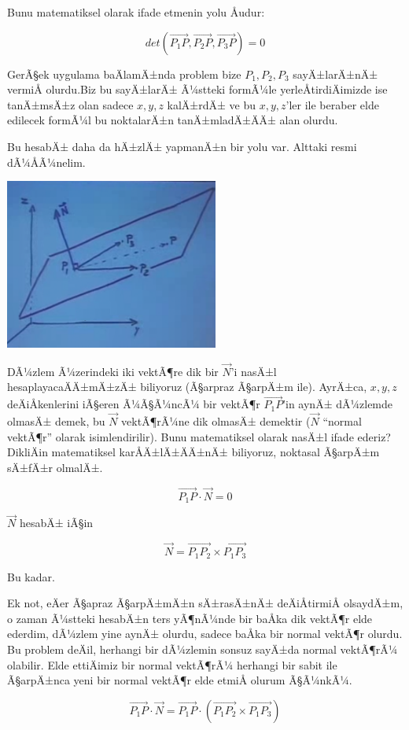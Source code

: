 \documentclass[12pt,fleqn]{article}\usepackage{../../common}
\begin{document}
Bunu matematiksel olarak ifade etmenin yolu Åudur:

$$ det(\vec{P_1P},\vec{P_2P},\vec{P_3P}) = 0 $$

GerÃ§ek uygulama baÄlamÄ±nda problem bize $P_1,P_2,P_3$ 
sayÄ±larÄ±nÄ± vermiÅ
olurdu.Biz bu sayÄ±larÄ± Ã¼stteki formÃ¼le yerleÅtirdiÄimizde ise 
tanÄ±msÄ±z olan
sadece $x,y,z$ kalÄ±rdÄ± ve bu $x,y,z$'ler ile beraber elde edilecek 
formÃ¼l bu
noktalarÄ±n tanÄ±mladÄ±ÄÄ± alan olurdu.

Bu hesabÄ± daha da hÄ±zlÄ± yapmanÄ±n bir yolu var. Alttaki resmi 
dÃ¼ÅÃ¼nelim. 
\begin{center}
\includegraphics[width=7cm]{3_3.png}
\end{center}
DÃ¼zlem Ã¼zerindeki iki vektÃ¶re dik bir $\vec{N}$'i nasÄ±l
hesaplayacaÄÄ±mÄ±zÄ± biliyoruz (Ã§arpraz Ã§arpÄ±m ile). 
AyrÄ±ca, $x,y,z$
deÄiÅkenlerini iÃ§eren Ã¼Ã§Ã¼ncÃ¼ bir vektÃ¶r $\vec{P_1P}$'in 
aynÄ± dÃ¼zlemde
olmasÄ± demek, bu $\vec{N}$ vektÃ¶rÃ¼ne dik olmasÄ± demektir ($\vec{N}$
``normal vektÃ¶r'' olarak isimlendirilir). Bunu matematiksel olarak nasÄ±l
ifade ederiz? DikliÄin matematiksel karÅÄ±lÄ±ÄÄ±nÄ± biliyoruz, 
noktasal Ã§arpÄ±m
sÄ±fÄ±r olmalÄ±.

$$ \vec{P_1P} \cdot \vec{N} = 0 $$

$\vec{N}$ hesabÄ± iÃ§in 

$$ \vec{N} = \vec{P_1P_2} \times \vec{P_1P_3}$$

Bu kadar. 

Ek not, eÄer Ã§apraz Ã§arpÄ±mÄ±n sÄ±rasÄ±nÄ± 
deÄiÅtirmiÅ olsaydÄ±m, o zaman Ã¼stteki
hesabÄ±n ters yÃ¶nÃ¼nde bir baÅka dik vektÃ¶r elde ederdim, dÃ¼zlem 
yine aynÄ±
olurdu, sadece baÅka bir normal vektÃ¶r olurdu. Bu problem deÄil, 
herhangi
bir dÃ¼zlemin sonsuz sayÄ±da normal vektÃ¶rÃ¼ olabilir. Elde 
ettiÄimiz bir
normal vektÃ¶rÃ¼ herhangi bir sabit ile Ã§arpÄ±nca yeni bir normal 
vektÃ¶r elde
etmiÅ olurum Ã§Ã¼nkÃ¼. 

$$ \vec{P_1P} \cdot \vec{N} = 
\vec{P_1P} \cdot (\vec{P_1P_2} \times \vec{P_1P_3})
$$
\end{document}
